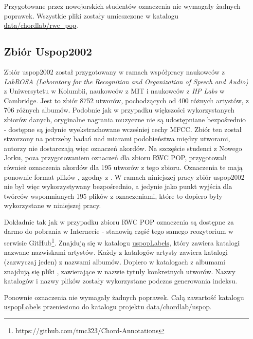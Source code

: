 Przygotowane przez nowojorskich studentów oznaczenia nie wymagały żadnych poprawek. Wszystkie pliki
 zostały umieszczone w katalogu \url{data/chordlab/rwc\_pop}.

\subsection{Zbiór Uspop2002}

Zbiór uspop2002 \cite{berenzweig_large-scale_2004} został przygotowany w ramach współpracy naukowców
z \emph{LabROSA (Laboratory for the Recognition and Organization of Speech and Audio)} z
Uniwersytetu w Kolumbii, naukowców z MIT i naukowców z \emph{HP Labs} w Cambridge. Jest to zbiór
8752 utworów, pochodzących od 400 różnych artystów, z 706 różnych albumów. Podobnie jak w przypadku
większości wykorzystanych zbiorów danych, oryginalne nagrania muzyczne nie są udostępniane
bezpośrednio - dostępne są jedynie wyekstrachowane wcześniej cechy MFCC. Zbiór ten został stworzony
na potrzeby badań nad miarami podobieństwa między utworami, autorzy nie dostarczają więc oznaczeń
akordów. Na szczęście studenci z Nowego Jorku, poza przygotowaniem oznaczeń dla zbioru RWC POP,
przygotowali również oznaczenia akordów dla 195 utworów z tego zbioru. Oznaczenia te mają ponownie
format plików , zgodny z \cite{harte_towards_nodate}. W ramach niniejszej pracy zbiór
uspop2002 nie był więc wykorzystywany bezpośrednio, a jedynie jako punkt wyjścia dla twórców
wspomnianych 195 plików z oznaczeniami, które to dopiero były wykorzystane w niniejszej pracy.

Dokładnie tak jak w przypadku zbioru RWC POP oznaczenia są dostępne za darmo do pobrania w
Internecie - stanowią część tego samego reozytorium w serwisie
GitHub\footnote{https://github.com/tmc323/Chord-Annotations}. Znajdują się w katalogu
\url{uspopLabels}, który zawiera katalogi nazwane nazwiskami artystów. Każdy z katalogów artysty
zawiera katalogi (zazwyczaj jeden) z nazwami albumów. Dopiero w katalogach z albumami znajdują się
pliki , zawierające w nazwie tytuły konkretnych utworów. Nazwy katalogów i nazwy plików
zostały wykorzystane podczas generowania indeksu.

Ponownie oznaczenia nie wymagały żadnych poprawek. Całą zawartość katalogu \url{uspopLabels}
przeniesiono do katalogu projektu \url{data/chordlab/uspop}.

